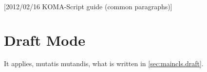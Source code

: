 %
%
%
%
%
%
%
%
% 
%
%
%
%

[2012/02/16 KOMA-Script guide (common paragraphs)]


\makeatletter
{}%
%
%
%
\makeatother


\section{Draft Mode}
\label{sec:\csname label@base\endcsname.draft}%
\ifshortversion\IgnoreThisfalse{}\fi%
\ifIgnoreThis %
It applies, mutatis mutandis, what is written in 
\autoref{sec:maincls.draft}.
\else %
%

